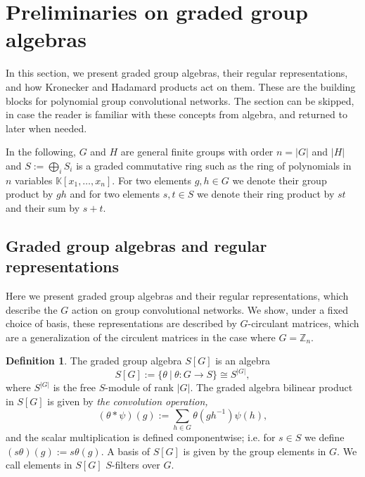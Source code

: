 \documentclass[final]{article}
\newcommand{\K}{\mathbb{K}}
\newcommand{\Z}{\mathbb{Z}}
\newcommand{\conv}{\ast}
\theoremstyle{definition}
\newtheorem{definition}{Definition}[section] %
\theoremstyle{plain}
\begin{document}
\section{Preliminaries on graded group algebras}\label{sec: preliminaries}
In this section, we present graded group algebras, their regular representations, and how Kronecker and Hadamard products act on them.
These are the building blocks for polynomial group convolutional networks. The section can be skipped, in case the reader is familiar with these concepts from algebra, and returned to later when needed. 

In the following, $G$ and $H$ are general finite groups with order $n=|G|$ and $|H|$ and $S:= \bigoplus_{i} S_i$ is a graded commutative ring such as the ring of polynomials in $n$ variables $\K[x_1, \dots, x_n]$.
For two elements $g, h\in G$ we denote their group product by $gh$ and for two elements $s, t \in S$ we denote their ring product by $st$ and their sum by $s+t$. 

\subsection{Graded group algebras and regular representations}
Here we present graded group algebras and their regular representations, which describe the $G$ action on group convolutional networks. 
We show, under a fixed choice of basis, these representations are described by $G$-circulant matrices, which are a generalization of the circulent matrices in the case where $G=\Z_n$.
\begin{definition}
 The graded group algebra $S[G]$ is an algebra
\[ 
S[G]:= \{\theta\ |\ \theta: G \to S\} \cong S^{|G|},
\]
where $S^{|G|}$ is the free $S$-module of rank ${|G|} $. The graded algebra bilinear product in $S[G]$ is given by \emph{the convolution operation,}
\[
(\theta \conv \psi)(g) := \sum_{h\in G}\theta(g h^{-1}) \psi(h),
\]
and the scalar multiplication is defined componentwise; i.e. for $s \in S$ we define $(s\theta)(g) := s\theta(g)$.
A basis of $S[G]$ is given by the group elements in $G$.
We call elements in $S[G]$ $S$-filters over $G$.
\end{definition}
\end{document}
